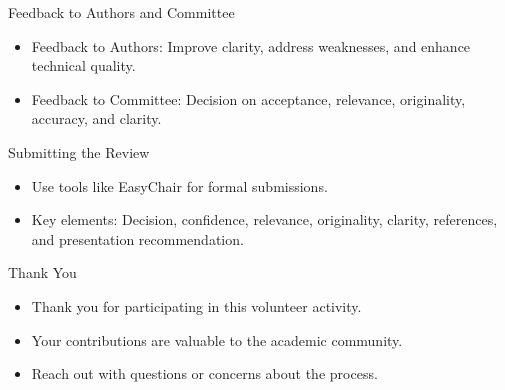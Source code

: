 \documentclass{beamer}
\begin{document}
\begin{frame}{Feedback to Authors and Committee}
    \begin{itemize}
        \item Feedback to Authors: Improve clarity, address weaknesses, and enhance technical quality.
        \item Feedback to Committee: Decision on acceptance, relevance, originality, accuracy, and clarity.
    \end{itemize}
\end{frame}

\begin{frame}{Submitting the Review}
    \begin{itemize}
        \item Use tools like EasyChair for formal submissions.
        \item Key elements: Decision, confidence, relevance, originality, clarity, references, and presentation recommendation.
    \end{itemize}
\end{frame}

\begin{frame}{Thank You}
    \begin{itemize}
        \item Thank you for participating in this volunteer activity.
        \item Your contributions are valuable to the academic community.
        \item Reach out with questions or concerns about the process.
    \end{itemize}
\end{frame}
\end{document}
